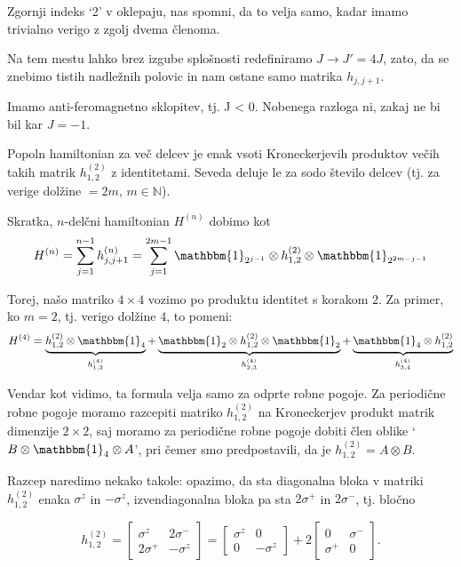 \documentclass[12pt, a4paper]{article}
\begin{document}
Zgornji indeks `2' v oklepaju, nas spomni, da to velja samo, kadar imamo trivialno verigo z zgolj dvema
\v clenoma.

Na tem mestu lahko brez izgube splošnosti redefiniramo $J \to J' = 4J$, zato, da se znebimo tistih
nadle\v znih polovic in nam ostane samo matrika $h_{j,j+1}$. 

Imamo anti-feromagnetno sklopitev, tj. J < 0. Nobenega razloga ni, zakaj ne bi bil kar $J = -1$.

Popoln hamiltonian za več delcev je enak vsoti Kroneckerjevih produktov večih takih matrik
$h^{(2)}_{1,2}$ z identitetami. Seveda deluje le za sodo število delcev (tj. za verige dolžine $
= 2m$, $m \in \mathbb{N}$).

Skratka, $n$-delčni hamiltonian $H^{(n)}$ dobimo kot
\begin{equation}
	H^{(n)} = \sum_{j = 1}^{n - 1} h^{(n)}_{j,j+1} = \sum_{j = 1}^{2m - 1} \mathbbm{1}_{2^{j-1}}
	\otimes h^{(2)}_{1,2} \otimes \mathbbm{1}_{2^{2m - j - 1}}
	\label{hamilton}
\end{equation}

Torej, na\v so matriko $4 \times 4$ vozimo po produktu identitet s korakom $2$. Za primer, ko $m = 2$,
tj. verigo dol\v zine $4$, to pomeni:
\[
	H^{(4)} = \underbrace{h^{(2)}_{1,2}\otimes\mathbbm{1}_4}_{h^{(4)}_{1,2}} +
		\underbrace{\mathbbm{1}_2\otimes h^{(2)}_{1,2}\otimes\mathbbm{1}_2}_{h^{(4)}_{2,3}} +
		\underbrace{\mathbbm{1}_4\otimes h^{(2)}_{1,2}}_{h^{(4)}_{3,4}}
\]

Vendar kot vidimo, ta formula velja samo za odprte robne pogoje. Za periodi\v cne robne pogoje
moramo razcepiti matriko $h^{(2)}_{1,2}$ na Kroneckerjev produkt matrik dimenzije $2 \times 2$, saj
moramo za periodi\v cne robne pogoje dobiti \v clen oblike `$B \otimes \mathbbm{1}_4 \otimes A$',
pri \v cemer smo predpostavili, da je $h^{(2)}_{1,2} = A \otimes B$.

Razcep naredimo nekako takole: opazimo, da sta diagonalna bloka v matriki $h^{(2)}_{1,2}$ enaka
$\sigma^z$ in $-\sigma^z$, izvendiagonalna bloka pa sta $2\sigma^+$ in $2\sigma^-$, tj. blo\v cno

\[
	h^{(2)}_{1,2} = \begin{bmatrix}
		\sigma^z & 2\sigma^- \\
		2\sigma^+ & -\sigma^z
	\end{bmatrix} = 
		\begin{bmatrix}
			\sigma^z & 0 \\
			0 & -\sigma^z
		\end{bmatrix} + 2\begin{bmatrix}
			0 & \sigma^- \\
			\sigma^+ & 0
		\end{bmatrix}.
\]
\end{document}
